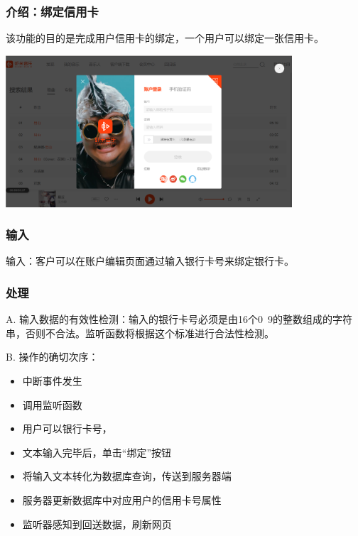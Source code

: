 			
			   \subsubsection{介绍：绑定信用卡}
			   该功能的目的是完成用户信用卡的绑定，一个用户可以绑定一张信用卡。
			   \begin{center} 
				 \includegraphics[width=0.8\textwidth]{./figures/capture4.png} 
				 \end{center}
			   \subsubsection{输入}
			   
			   输入：客户可以在账户编辑页面通过输入银行卡号来绑定银行卡。
			   
			   \subsubsection{处理}
			   
			   
			   
			   A. 输入数据的有效性检测：输入的银行卡号必须是由16个0~9的整数组成的字符串，否则不合法。监听函数将根据这个标准进行合法性检测。
			   
			   B. 操作的确切次序：
			   \begin{adjustwidth}{2cm}{1cm}\qquad
				   \begin{itemize}
					   \item 中断事件发生
					   \item 调用监听函数
					   \item 用户可以银行卡号，
					   \item 文本输入完毕后，单击“绑定”按钮
					   \item 将输入文本转化为数据库查询，传送到服务器端
					   \item 服务器更新数据库中对应用户的信用卡号属性
					   \item 监听器感知到回送数据，刷新网页
				   \end{itemize}		
			   \end{adjustwidth}
				

